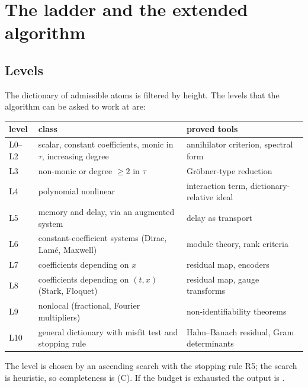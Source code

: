 \section{The ladder and the extended algorithm}\label{sec:ladder}
\subsection{Levels}
The dictionary of admissible atoms is filtered by height. The levels that the algorithm can be asked to work at are:
\begin{center}\small
\begin{tabular}{@{}llp{6.3cm}@{}}
\toprule
level & class & proved tools\\
\midrule
L0--L2 & scalar, constant coefficients, monic in $\tau$, increasing degree & annihilator criterion, spectral form\\
L3 & non-monic or degree $\ge2$ in $\tau$ & Gr\"obner-type reduction\\
L4 & polynomial nonlinear & interaction term, dictionary-relative ideal\\
L5 & memory and delay, via an augmented system & delay as transport\\
L6 & constant-coefficient systems (Dirac, Lam\'e, Maxwell) & module theory, rank criteria\\
L7 & coefficients depending on $x$ & residual map, encoders\\
L8 & coefficients depending on $(t,x)$ (Stark, Floquet) & residual map, gauge transforms\\
L9 & nonlocal (fractional, Fourier multipliers) & non-identifiability theorems\\
L10 & general dictionary with misfit test and stopping rule & Hahn--Banach residual, Gram determinants\\
\bottomrule
\end{tabular}
\end{center}
The level is chosen by an ascending search with the stopping rule R5; the search is heuristic, so completeness is (C). If the budget is exhausted the output is \UND.


